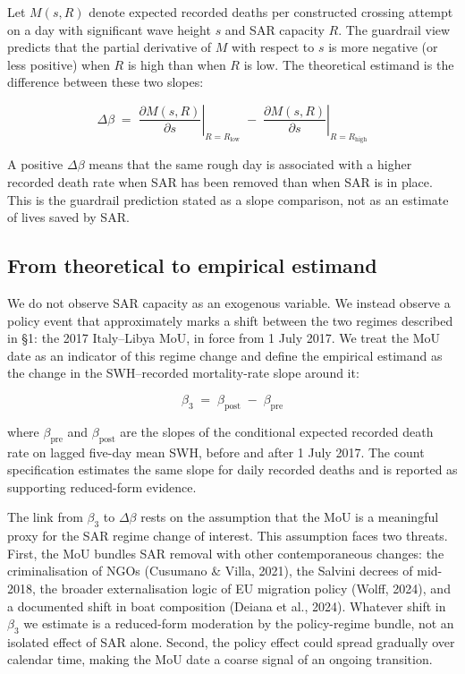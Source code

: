 \documentclass[
  11pt,
  a4paper,
]{article}
\begin{document}
Let \(M(s, R)\) denote expected recorded deaths per constructed crossing
attempt on a day with significant wave height \(s\) and SAR capacity
\(R\). The guardrail view predicts that the partial derivative of \(M\)
with respect to \(s\) is more negative (or less positive) when \(R\) is
high than when \(R\) is low. The theoretical estimand is the difference
between these two slopes:

\[
\Delta\beta \;=\; \left.\frac{\partial M(s, R)}{\partial s}\right|_{R=R_{\text{low}}}
\;-\; \left.\frac{\partial M(s, R)}{\partial s}\right|_{R=R_{\text{high}}}
\]

A positive \(\Delta\beta\) means that the same rough day is associated
with a higher recorded death rate when SAR has been removed than when
SAR is in place. This is the guardrail prediction stated as a slope
comparison, not as an estimate of lives saved by SAR.

\subsection{From theoretical to empirical
estimand}\label{from-theoretical-to-empirical-estimand}

We do not observe SAR capacity as an exogenous variable. We instead
observe a policy event that approximately marks a shift between the two
regimes described in §1: the 2017 Italy--Libya MoU, in force from 1 July
2017. We treat the MoU date as an indicator of this regime change and
define the empirical estimand as the change in the SWH--recorded
mortality-rate slope around it:

\[
\beta_3 \;=\; \beta_{\text{post}} \;-\; \beta_{\text{pre}}
\]

where \(\beta_{\text{pre}}\) and \(\beta_{\text{post}}\) are the slopes
of the conditional expected recorded death rate on lagged five-day mean
SWH, before and after 1 July 2017. The count specification estimates the
same slope for daily recorded deaths and is reported as supporting
reduced-form evidence.

The link from \(\beta_3\) to \(\Delta\beta\) rests on the assumption
that the MoU is a meaningful proxy for the SAR regime change of
interest. This assumption faces two threats. First, the MoU bundles SAR
removal with other contemporaneous changes: the criminalisation of NGOs
(Cusumano \& Villa, 2021), the Salvini decrees of mid-2018, the broader
externalisation logic of EU migration policy (Wolff, 2024), and a
documented shift in boat composition (Deiana et al., 2024). Whatever
shift in \(\beta_3\) we estimate is a reduced-form moderation by the
policy-regime bundle, not an isolated effect of SAR alone. Second, the
policy effect could spread gradually over calendar time, making the MoU
date a coarse signal of an ongoing transition.
\end{document}
